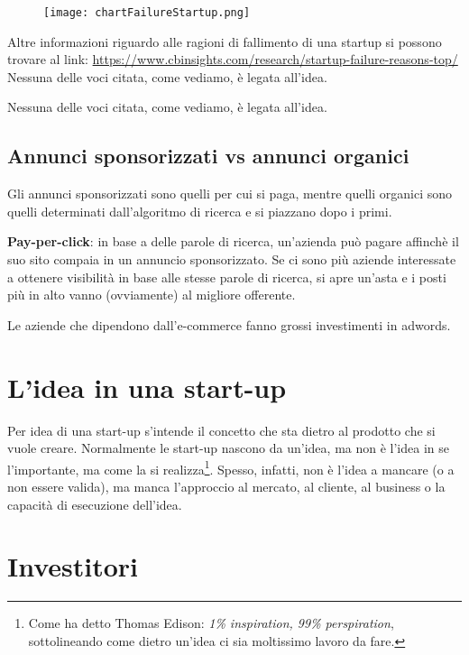 \begin{figure}[H]
\texttt{[image: chartFailureStartup.png]}
\end{figure}

Altre informazioni riguardo alle ragioni di fallimento di una startup si possono
trovare al link: \url{https://www.cbinsights.com/research/startup-failure-reasons-top/}
Nessuna delle voci citata, come vediamo, è legata all'idea.

Nessuna delle voci citata, come vediamo, è legata all'idea.

\subsection{Annunci sponsorizzati vs annunci organici}

Gli annunci sponsorizzati sono quelli per cui si paga, mentre quelli organici sono
quelli determinati dall'algoritmo di ricerca e si piazzano dopo i primi.

\textbf{Pay-per-click}: in base a delle parole di ricerca, un'azienda può pagare
affinchè il suo sito compaia in un annuncio sponsorizzato. Se ci sono più aziende
interessate a ottenere visibilità in base alle stesse parole di ricerca, si apre
un'asta e i posti più in alto vanno (ovviamente) al migliore offerente.

Le aziende che dipendono dall'e-commerce fanno grossi investimenti in adwords.

\section{L'idea in una start-up}

Per idea di una start-up s'intende il concetto che sta dietro al prodotto che
si vuole creare. Normalmente le start-up nascono da un'idea, ma non è l'idea in
se l'importante, ma come la si realizza\footnote{Come ha detto Thomas Edison:
\emph{1\% inspiration, 99\% perspiration}, sottolineando come dietro un'idea
ci sia moltissimo lavoro da fare.}. Spesso, infatti, non è l'idea a mancare
(o a non essere valida), ma manca l'approccio al mercato, al cliente, al 
business o la capacità di esecuzione dell'idea.

\section{Investitori}

